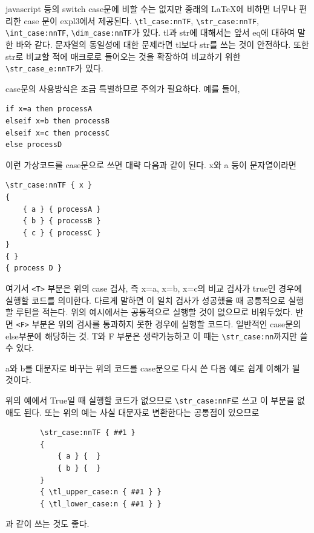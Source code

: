 \documentclass[a4paper,amsmath]{oblivoir}
\begin{document}

javascript 등의 switch case문에 비할 수는 없지만 종래의 \LaTeX 에 비하면 너무나 편리한 case 문이 expl3에서 제공된다. \verb|\tl_case:nnTF|, \verb|\str_case:nnTF|, \verb|\int_case:nnTF|, \verb|\dim_case:nnTF|가 있다. tl과 str에 대해서는 앞서 eq에 대하여 말한 바와 같다. 문자열의 동일성에 대한 문제라면 tl보다 str를 쓰는 것이 안전하다. 또한 str로 비교할 적에 매크로로 들어오는 것을 확장하여 비교하기 위한 \verb|\str_case_e:nnTF|가 있다.

case문의 사용방식은 조금 특별하므로 주의가 필요하다. 예를 들어,
\begin{verbatim}
if x=a then processA
elseif x=b then processB
elseif x=c then processC
else processD
\end{verbatim}
이런 가상코드를 case문으로 쓰면 대략 다음과 같이 된다. x와 a 등이 문자열이라면
\begin{verbatim}
\str_case:nnTF { x }
{
    { a } { processA }
    { b } { processB }
    { c } { processC }
}
{ }
{ process D }
\end{verbatim}
여기서 \texttt{<T>} 부분은 위의 case 검사, 즉 x=a, x=b, x=c의 비교 검사가 true인 경우에 실행할 코드를 의미한다. 다르게 말하면 이 일치 검사가 성공했을 때 공통적으로 실행할 루틴을 적는다. 위의 예시에서는 공통적으로 실행할 것이 없으므로 비워두었다.
반면 \verb|<F>| 부분은 위의 검사를 통과하지 못한 경우에 실행할 코드다. 일반적인 case문의 else부분에 해당하는 것. T와 F 부분은 생략가능하고 이 때는 \verb|\str_case:nn|까지만 쓸 수 있다.

a와 b를 대문자로 바꾸는 위의 코드를 case문으로 다시 쓴 다음 예로 쉽게 이해가 될 것이다.
위의 예에서 True일 때 실행할 코드가 없으므로 \verb|\str_case:nnF|로 쓰고 이 부분을 없애도 된다. 또는 위의 예는 사실 대문자로 변환한다는 공통점이 있으므로
\begin{verbatim}
        \str_case:nnTF { ##1 }
        {
            { a } {  }
            { b } {  }
        }
        { \tl_upper_case:n { ##1 } }
        { \tl_lower_case:n { ##1 } }
\end{verbatim}
과 같이 쓰는 것도 좋다.
\end{document}
